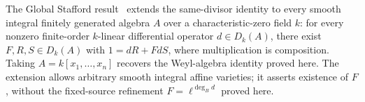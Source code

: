 % 

The Global Stafford result~\cite{GlobalStaffordPalomar2026,GlobalStaffordZenodo106}
extends the same-divisor identity to every smooth
integral finitely generated algebra $A$ over a characteristic-zero field $k$:
for every nonzero finite-order $k$-linear differential operator $d\in D_k(A)$,
there exist $F,R,S\in D_k(A)$ with $1=dR+FdS$, where multiplication is
composition. Taking $A=k[x_1,\ldots,x_n]$ recovers the Weyl-algebra identity
proved here. The extension allows arbitrary smooth integral affine varieties;
it asserts existence of $F$, without the fixed-source refinement
$F=\ell^{\deg_B d}$ proved here.
